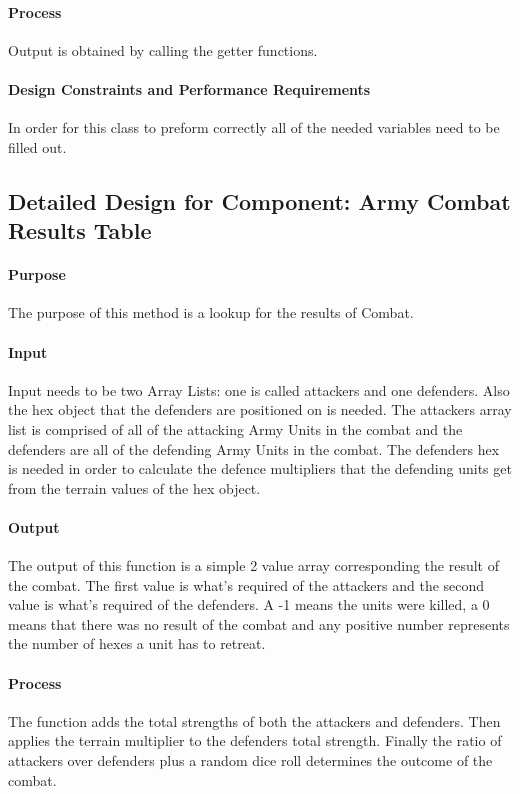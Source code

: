\documentclass[12pt,a4paper]{article}
\begin{document}
\paragraph{Process} Output is obtained by calling the getter functions. 
\paragraph{Design Constraints and Performance Requirements}	In order for this class to preform correctly all of the needed variables need to be filled out.

\subsection{Detailed Design for Component: Army Combat Results Table}
\paragraph{Purpose} The purpose of this method is a lookup for the results of Combat. 
\paragraph{Input} Input needs to be two Array Lists: one is called attackers and one defenders. Also the hex object that the defenders are positioned on is needed. The attackers array list is comprised of all of the attacking Army Units in the combat and the defenders are all of the defending Army Units in the combat. The defenders hex is needed in order to calculate the defence multipliers that the defending units get from the terrain values of the hex object.
\paragraph{Output} The output of this function is a simple 2 value array corresponding the result of the combat. The first value is what's required of the attackers and the second value is what's required of the defenders. A -1 means the units were killed, a 0 means that there was no result of the combat and any positive number represents the number of hexes a unit has to retreat. 
\paragraph{Process} The function adds the total strengths of both the attackers and defenders. Then applies the terrain multiplier to the defenders total strength. Finally the ratio of attackers over defenders plus a random dice roll determines the outcome of the combat.  
\end{document}
